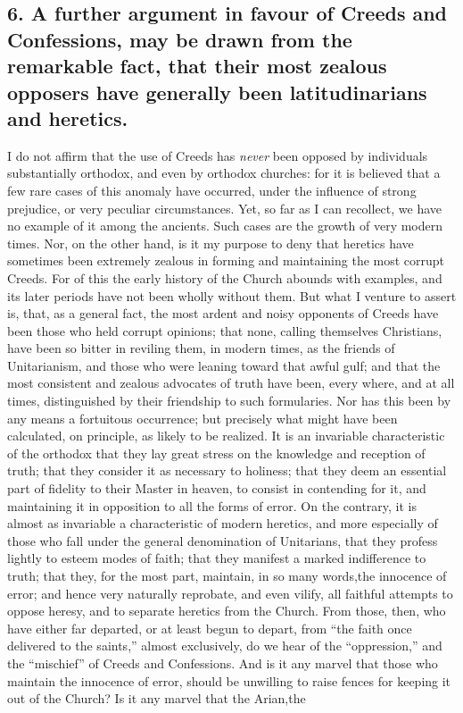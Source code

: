\documentclass[
]{book}
\begin{document}
\hypertarget{a-further-argument-in-favour-of-creeds-and-confessions-may-be-drawn-from-the-remarkable-fact-that-their-most-zealous-opposers-have-generally-been-latitudinarians-and-heretics.}{%
\subsection{6. A further argument in favour of Creeds and Confessions, may be drawn from the remarkable fact, that their most zealous opposers have generally been latitudinarians and heretics.}\label{a-further-argument-in-favour-of-creeds-and-confessions-may-be-drawn-from-the-remarkable-fact-that-their-most-zealous-opposers-have-generally-been-latitudinarians-and-heretics.}}

I do not affirm that the use of Creeds has \emph{never} been opposed by individuals substantially orthodox, and even by orthodox churches: for it is believed that a few rare cases of this anomaly have occurred, under the influence of strong prejudice, or very peculiar circumstances. Yet, so far as I can recollect, we have no example of it among the ancients. Such cases are the growth of very modern times. Nor, on the other hand, is it my purpose to deny that heretics have sometimes been extremely zealous in forming and maintaining the most corrupt Creeds. For of this the early history of the Church abounds with examples, and its later periods have not been wholly without them. But what I venture to assert is, that, as a general fact, the most ardent and noisy opponents of Creeds have been those who held corrupt opinions; that none, calling themselves Christians, have been so bitter in reviling them, in modern times, as the friends of Unitarianism, and those who were leaning toward that awful gulf; and that the most consistent and zealous advocates of truth have been, every where, and at all times, distinguished by their friendship to such formularies. Nor has this been by any means a fortuitous occurrence; but precisely what might have been calculated, on principle, as likely to be realized. It is an invariable characteristic of the orthodox that they lay great stress on the knowledge and reception of truth; that they consider it as necessary to holiness; that they deem an essential part of fidelity to their Master in heaven, to consist in contending for it, and maintaining it in opposition to all the forms of error. On the contrary, it is almost as invariable a characteristic of modern heretics, and more especially of those who fall under the general denomination of Unitarians, that they profess lightly to esteem modes of faith; that they manifest a marked indifference to truth; that they, for the most part, maintain, in so many words,the innocence of error; and hence very naturally reprobate, and even vilify, all faithful attempts to oppose heresy, and to separate heretics from the Church. From those, then, who have either far departed, or at least begun to depart, from ``the faith once delivered to the saints,'' almost exclusively, do we hear of the ``oppression,'' and the ``mischief'' of Creeds and Confessions. And is it any marvel that those who maintain the innocence of error, should be unwilling to raise fences for keeping it out of the Church? Is it any marvel that the Arian,the 
\end{document}
